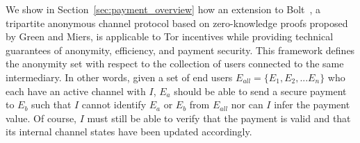 We show in Section~\ref{sec:payment_overview} how an extension to Bolt~\cite{green2017bolt}, a tripartite anonymous channel protocol based on zero-knowledge proofs proposed by Green and Miers, is applicable to Tor incentives while providing technical guarantees of anonymity, efficiency, and payment security.
This framework defines the anonymity set with respect to the collection of users connected to the same intermediary.
In other words, given a set of end users $E_{all} = \{E_1, E_2, ...
E_n\}$ who each have an active channel with $I$, $E_a$ should be able to send a secure payment to $E_b$ such that $I$ cannot identify $E_a$ or $E_b$ from $E_{all}$ nor can $I$ infer the payment value.
Of course, $I$ must still be able to verify that the payment is valid and that its internal channel states have been updated accordingly.

